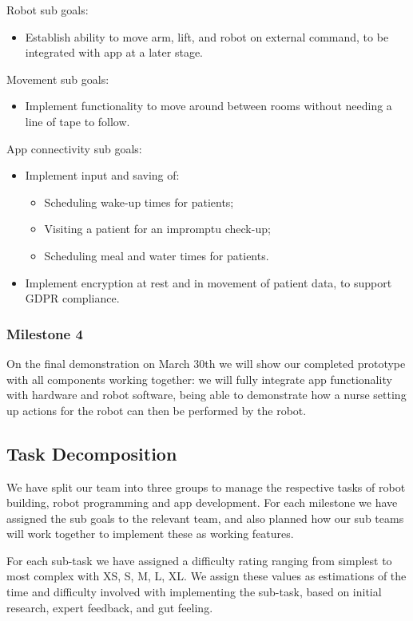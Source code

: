 \documentclass{article}
\begin{document}
Robot sub goals:
\begin{itemize}
\item Establish ability to move arm, lift, and robot on external command, to be integrated with app at a later stage. 
\end{itemize}

Movement sub goals:
\begin{itemize}
\item Implement functionality to move around between rooms without needing a line of tape to follow.
\end{itemize}

App connectivity sub goals:
\begin{itemize}
\item Implement input and saving of:
  \begin{itemize}
  \item Scheduling wake-up times for patients;
  \item Visiting a patient for an impromptu check-up;
  \item Scheduling meal and water times for patients. 
  \end{itemize}
\item Implement encryption at rest and in movement of patient data, to support GDPR compliance. 
\end{itemize}

\subsubsection{Milestone 4}

On the final demonstration on March 30th we will show our completed prototype with all components working together: we will fully integrate app functionality with hardware and robot software, being able to demonstrate how a nurse setting up actions for the robot can then be performed by the robot. 

\subsection{Task Decomposition}

We have split our team into three groups to manage the respective tasks of robot building, robot programming and app development. For each milestone we have assigned the sub goals to the relevant team, and also planned how our sub teams will work together to implement these as working features.

For each sub-task we have assigned a difficulty rating ranging from simplest to most complex with XS, S, M, L, XL. We assign these values as estimations of the time and difficulty involved with implementing the sub-task, based on initial research, expert feedback, and gut feeling. 
\end{document}
